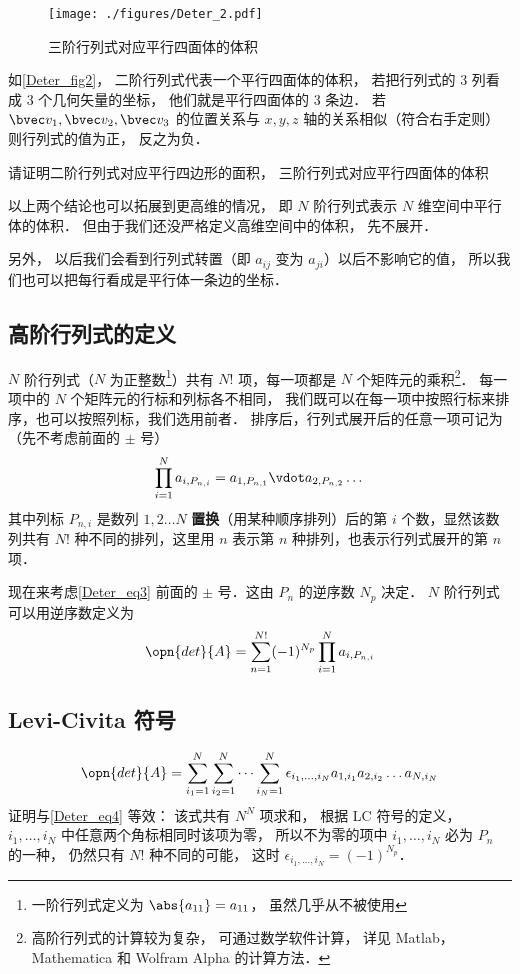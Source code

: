 \begin{figure}[ht]
\centering
\texttt{[image: ./figures/Deter\_2.pdf]}
\caption{三阶行列式对应平行四面体的体积} \label{Deter_fig2}
\end{figure}
如\autoref{Deter_fig2}， 二阶行列式代表一个平行四面体的体积， 若把行列式的 3 列看成 3 个几何矢量的坐标， 他们就是平行四面体的 3 条边． 若 $\bvec v_1, \bvec v_2, \bvec v_3$ 的位置关系与 $x, y, z$ 轴的关系相似（符合右手定则） 则行列式的值为正， 反之为负．

\begin{exercise}{}
请证明二阶行列式对应平行四边形的面积， 三阶行列式对应平行四面体的体积
\end{exercise}

以上两个结论也可以拓展到更高维的情况， 即 $N$ 阶行列式表示 $N$ 维空间中平行体的体积． 但由于我们还没严格定义高维空间中的体积， 先不展开． 

另外， 以后我们会看到行列式转置（即 $a_{ij}$ 变为 $a_{ji}$）以后不影响它的值， %
所以我们也可以把每行看成是平行体一条边的坐标．

\subsection{高阶行列式的定义}


$N$ 阶行列式（$N$ 为正整数\footnote{一阶行列式定义为 $\abs{a_{11}}=a_{11}$， 虽然几乎从不被使用}）共有 $N!$ 项，每一项都是 $N$ 个矩阵元的乘积\footnote{高阶行列式的计算较为复杂， 可通过数学软件计算， 详见 Matlab，Mathematica 和 Wolfram Alpha 的计算方法．%
}． 每一项中的 $N$ 个矩阵元的行标和列标各不相同， 我们既可以在每一项中按照行标来排序，也可以按照列标，我们选用前者． 排序后，行列式展开后的任意一项可记为（先不考虑前面的 $\pm$ 号）
\begin{equation}\label{Deter_eq3}
\prod_{i=1}^N a_{i,P_{n,i}} = 
a_{1,P_{n,1}} \vdot a_{2,P_{n,2}} \dots
\end{equation}
其中列标 $P_{n,i}$ 是数列 $1,2 \dots N$ \textbf{置换}（用某种顺序排列）后的第 $i$ 个数，显然该数列共有 $N!$ 种不同的排列，这里用 $n$ 表示第 $n$ 种排列，也表示行列式展开的第 $n$ 项．

现在来考虑\autoref{Deter_eq3} 前面的 $\pm$ 号．这由 $P_n$ 的逆序数 $N_p$ 决定． $N$ 阶行列式可以用逆序数定义为
\begin{equation}\label{Deter_eq4}
\opn{det}{A} = \sum_{n=1}^{N!} (-1)^{N_p} \prod_{i=1}^N a_{i,P_{n,i}}
\end{equation}

\subsection{Levi-Civita 符号}
\begin{equation}
\opn{det}{A} = \sum_{i_1 = 1}^N \sum_{i_2 = 1}^N \dots \sum_{i_N = 1}^N \epsilon_{i_1, \dots, i_N} a_{1,i_1}a_{2,i_2}\dots a_{N,i_N}
\end{equation}
证明与\autoref{Deter_eq4} 等效： 该式共有 $N^N$ 项求和， 根据 LC 符号的定义， $i_1, \dots, i_N$ 中任意两个角标相同时该项为零， 所以不为零的项中 $i_1, \dots, i_N$ 必为 $P_n$ 的一种， 仍然只有 $N!$ 种不同的可能， 这时 $\epsilon_{i_1, \dots, i_N} = (-1)^{N_p}$．
